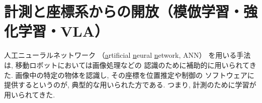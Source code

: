 \documentclass[twocolumn]{jarticle} %
\begin{document}
%
%
%
%
%
%
%
%
%
%
%
%


\section{計測と座標系からの開放（模倣学習・強化学習・VLA）}

人工ニューラルネットワーク
（\underline{a}rtificial \underline{n}eural
\underline{n}etwork, ANN）
を用いる手法は, 
移動ロボットにおいては画像処理などの
認識のために補助的に用いられてきた. 
画像中の特定の物体を認識し, 
その座標を位置推定や制御の
ソフトウェアに提供するというのが, 
典型的な用いられた方である. 
つまり, 計測のために学習が用いられてきた. 
\end{document}
